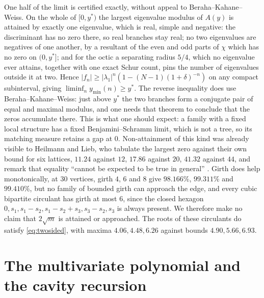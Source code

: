 \documentclass[11pt]{article}
\theoremstyle{remark}
\begin{document}
One half of the limit is certified exactly, without appeal to
Beraha--Kahane--Weiss. On the whole of $[0,y^*)$ the largest eigenvalue modulus of
$A(y)$ is attained by exactly one eigenvalue, which is real, simple and negative:
the discriminant has no zero there, so real branches stay real; no two eigenvalues
are negatives of one another, by a resultant of the even and odd parts of $\chi$
which has no zero on $(0,y^*]$; and for the octic a separating radius $5/4$, which
no eigenvalue ever attains, together with one exact Schur count, pins the number of
eigenvalues outside it at two. Hence $|f_n|\ge|\lambda_1|^n(1-(N-1)(1+\delta)^{-n})$
on any compact subinterval, giving $\liminf_ny_{\min}(n)\ge y^*$. The reverse
inequality does use Beraha--Kahane--Weiss: just above $y^*$ the two branches form a
conjugate pair of equal and maximal modulus, and one needs that theorem to conclude
that the zeros accumulate there. This is what one should expect:
a family with a fixed local structure has a fixed Benjamini--Schramm limit, which
is not a tree, so its matching measure retains a gap at $0$. Non-attainment of
this kind was already visible to Heilmann and Lieb, who tabulate the largest zero
against their own bound for six lattices, $11.24$ against $12$, $17.86$ against
$20$, $41.32$ against $44$, and remark that equality ``cannot be expected to be
true in general'' \cite[Table 1 and Remark 4.3]{HL}. Girth does help
monotonically, at $30$ vertices, girth $4$, $6$ and $8$ give $98.166\%$,
$99.311\%$ and $99.410\%$, but no family of bounded girth can approach the
edge, and every cubic bipartite circulant has girth at most $6$, since the closed
hexagon $0,s_1,s_1-s_2,s_1-s_2+s_3,s_3-s_2,s_3$ is always present. We therefore
make no claim that $2\sqrt m$ is attained or approached. The roots of these
circulants do satisfy \eqref{eq:twosided}, with maxima $4.06,4.48,6.26$ against
bounds $4.90,5.66,6.93$.

\section{The multivariate polynomial and the cavity recursion}
\end{document}
